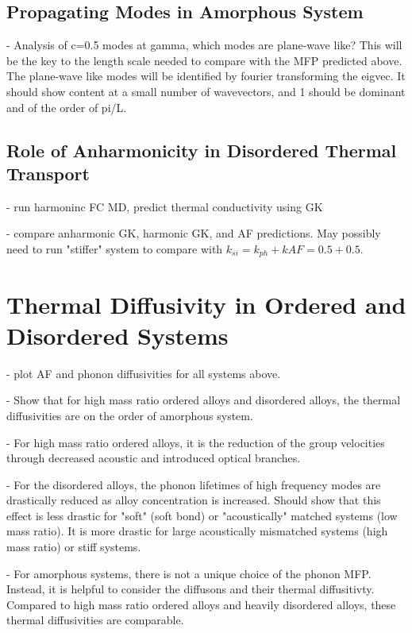 \documentclass[aps,prl,onecolumn,groupedaddress,amsmath,amssymb,12pt]{revtex4}
\begin{document}
\subsection{\label{S-Motivation-Amorphous}Propagating Modes in Amorphous System}

- Analysis of c=0.5 modes at gamma, which modes are plane-wave like? This will be the key to the length scale needed to compare with the MFP predicted above. The plane-wave like modes will be identified by fourier transforming the eigvec.  It should show content at a small number of wavevectors, and 1 should be dominant and of the order of pi/L. 

\subsection{\label{S-Motivation-Amorphous}Role of Anharmonicity in Disordered Thermal Transport}

- run harmoninc FC MD, predict thermal conductivity using GK

- compare anharmonic GK, harmonic GK, and AF predictions. May possibly need to run "stiffer" system to compare with $k_{si} = k_{ph} + k{AF} = 0.5+0.5$. 

\section{\label{S-Motivation} Thermal Diffusivity in Ordered and Disordered Systems}



- plot AF and phonon diffusivities for all systems above.  

- Show that for high mass ratio ordered alloys and disordered alloys, the thermal diffusivities are on the order of amorphous system. 

- For high mass ratio ordered alloys, it is the reduction of the group velocities through decreased acoustic and introduced optical branches. 

- For the disordered alloys, the phonon lifetimes of high frequency modes are drastically reduced as alloy concentration is increased.  Should show that this effect is less drastic for "soft" (soft bond) or "acoustically" matched systems (low mass ratio). It is more drastic for large acoustically mismatched systems (high mass ratio) or stiff systems.

- For amorphous systems, there is not a unique choice of the phonon MFP. Instead, it is helpful to consider the diffusons and their thermal diffusitivty. Compared to high mass ratio ordered alloys and heavily disordered alloys, these thermal diffusivities are comparable.  
\end{document}
